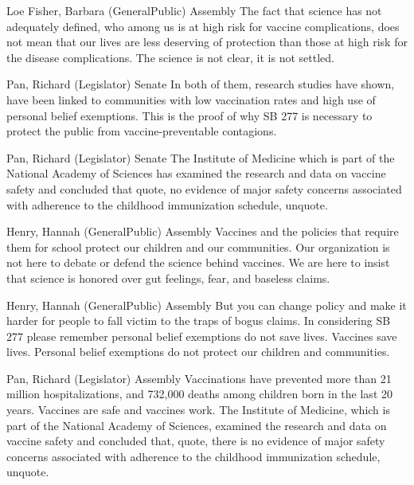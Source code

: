 \begin{result}{13.691386997566582}{Loe Fisher, Barbara (GeneralPublic) Assembly}
The fact that science has not adequately defined, who among us is at high risk for vaccine complications, does not mean that our lives are less deserving of protection than those at high risk for the disease complications. The science is not clear, it is not settled.
\end{result}

\begin{result}{13.028539089834828}{Pan, Richard (Legislator) Senate}
In both of them, research studies have shown, have been linked to communities with low vaccination rates and high use of personal belief exemptions. This is the proof of why SB 277 is necessary to protect the public from vaccine-preventable contagions.
\end{result}

\begin{result}{12.129959145841429}{Pan, Richard (Legislator) Senate}
The Institute of Medicine which is part of the National Academy of Sciences has examined the research and data on vaccine safety and concluded that quote, no evidence of major safety concerns associated with adherence to the childhood immunization schedule, unquote.
\end{result}

\begin{result}{11.458641196415645}{Henry, Hannah (GeneralPublic) Assembly}
Vaccines and the policies that require them for school protect our children and our communities. Our organization is not here to debate or defend the science behind vaccines. We are here to insist that science is honored over gut feelings, fear, and baseless claims.
\end{result}

\begin{result}{11.227696055896198}{Henry, Hannah (GeneralPublic) Assembly}
But you can change policy and make it harder for people to fall victim to the traps of bogus claims. In considering SB 277 please remember personal belief exemptions do not save lives. Vaccines save lives. Personal belief exemptions do not protect our children and communities.
\end{result}

\begin{result}{9.309836688528586}{Pan, Richard (Legislator) Assembly}
Vaccinations have prevented more than 21 million hospitalizations, and 732,000 deaths among children born in the last 20 years. Vaccines are safe and vaccines work. The Institute of Medicine, which is part of the National Academy of Sciences, examined the research and data on vaccine safety and concluded that, quote, there is no evidence of major safety concerns associated with adherence to the childhood immunization schedule, unquote.
\end{result}

